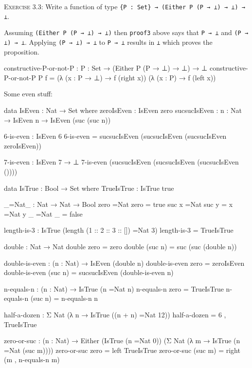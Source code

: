 \documentclass{article}
\begin{document}
\noindent
\textsc{Exercise 3.3}: Write a function of type \verb!{P : Set} → (Either P (P → ⊥) → ⊥) → ⊥!.

Assuming \verb!(Either P (P → ⊥) → ⊥)! then \texttt{proof3} above says that \verb!P → ⊥! and \verb!(P → ⊥) → ⊥!. Applying \verb!(P → ⊥) → ⊥! to \verb!P → ⊥! results in \verb!⊥! which proves the proposition.

\begin{code}
constructive-P-or-not-P : {P : Set} → (Either P (P → ⊥) → ⊥) → ⊥
constructive-P-or-not-P {P} f =
    (λ (x : P → ⊥) → f (right x)) (λ (x : P) → f (left x))
\end{code}

\noindent Some even stuff:

\begin{code}
data IsEven : Nat → Set where
    zeroIsEven : IsEven zero
    sucsucIsEven : {n : Nat} → IsEven n → IsEven (suc (suc n))

6-is-even : IsEven 6
6-is-even = sucsucIsEven (sucsucIsEven (sucsucIsEven zeroIsEven))

7-is-even : IsEven 7 → ⊥
7-is-even (sucsucIsEven (sucsucIsEven (sucsucIsEven ())))

data IsTrue : Bool → Set where
    TrueIsTrue : IsTrue true

_=Nat_ : Nat → Nat → Bool
zero =Nat zero = true
suc x =Nat suc y = x =Nat y
_ =Nat _ = false

length-is-3 : IsTrue (length (1 :: 2 :: 3 :: []) =Nat 3)
length-is-3 = TrueIsTrue
\end{code}

\begin{code}
double : Nat → Nat
double zero = zero
double (suc n) = suc (suc (double n))

double-is-even : (n : Nat) → IsEven (double n)
double-is-even zero = zeroIsEven
double-is-even (suc n) = sucsucIsEven (double-is-even n)
\end{code}

\begin{code}
n-equals-n : (n : Nat) → IsTrue (n =Nat n)
n-equals-n zero = TrueIsTrue
n-equals-n (suc n) = n-equals-n n

half-a-dozen : Σ Nat (λ n → IsTrue ((n + n) =Nat 12))
half-a-dozen = 6 , TrueIsTrue

zero-or-suc : (n : Nat) → Either
    (IsTrue (n =Nat 0))
    (Σ Nat (λ m → IsTrue (n =Nat (suc m))))
zero-or-suc zero = left TrueIsTrue
zero-or-suc (suc m) = right (m , n-equals-n m)
\end{code}
\end{document}
